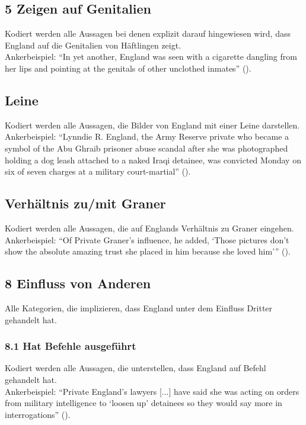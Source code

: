 \documentclass[12pt, titlepage=true, toc=bib]{scrartcl}
\begin{document}
\subsection*{5 Zeigen auf Genitalien}

Kodiert werden alle Aussagen bei denen explizit darauf hingewiesen wird, dass England auf die Genitalien von Häftlingen zeigt.\\
Ankerbeispiel: "`In yet another, England was seen with a cigarette dangling from her lips and pointing at the genitals of other unclothed inmates"' (\cite[2]{becker_face_2004}).

\subsection*{Leine}

Kodiert werden alle Aussagen, die Bilder von England mit einer Leine darstellen.\\
Ankerbeispiel: "`Lynndie R. England, the Army Reserve private who became a symbol of the Abu Ghraib prisoner abuse scandal after she was photographed holding a dog leash attached to a naked Iraqi detainee, was convicted Monday on six of seven charges at a military court-martial"' (\cite[1]{gerstenzang_female_2005}).

\subsection*{Verhältnis zu/mit Graner}

Kodiert werden alle Aussagen, die auf Englands Verhältnis zu Graner eingehen.\\
Ankerbeispiel: \enquote{Of Private Graner's influence, he added, \enquote{Those pictures don't show the absolute amazing trust she placed in him because she loved him}} (\cite[1]{cloud_g.i.s_2005}).

\subsection*{8 Einfluss von Anderen}

Alle Kategorien, die implizieren, dass England unter dem Einfluss Dritter gehandelt hat.

\subsubsection*{8.1 Hat Befehle ausgeführt}

Kodiert werden alle Aussagen, die unterstellen, dass England auf Befehl gehandelt hat.\\
Ankerbeispiel: \enquote{Private England's lawyers [...] have said she was acting on orders from military intelligence to \enquote{loosen up} detainees so they would say more in interrogations} (\cite[2]{zernike_conflict_2004}).
\end{document}
